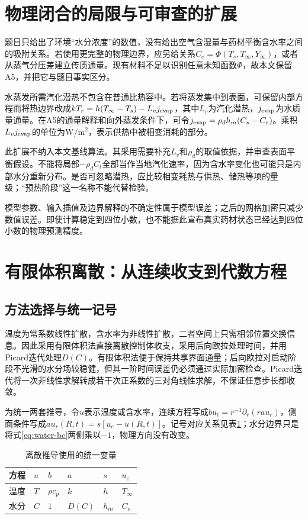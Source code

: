 \documentclass[UTF8,a4paper,zihao=-4,fontset=none]{ctexart}
\numberwithin{equation}{section}
\newcommand{\pd}{\partial}
\begin{document}
\section{物理闭合的局限与可审查的扩展}
题目只给出了环境“水分浓度”的数值，没有给出空气含湿量与药材平衡含水率之间的吸附关系。若使用更完整的物理边界，应另给关系$C_e=\Phi(T_s,T_\infty,Y_\infty)$，或者从蒸气分压差建立传质通量。现有材料不足以识别任意未知函数$\Phi$，故本文保留A5，并把它与题目事实区分。

水蒸发所需汽化潜热不包含在普通比热容中。若将蒸发集中到表面，可保留内部方程而将热边界改成$kT_r=h(T_\infty-T_s)-L_vj_{\rm evap}$，其中$L_v$为汽化潜热，$j_{\rm evap}$为水质量通量。在A5的通量解释和向外蒸发条件下，可令$j_{\rm evap}=\rho_dh_m(C_s-C_e)$。乘积$L_vj_{\rm evap}$的单位为$\mathrm{W/m^2}$，表示供热中被相变消耗的部分。

此扩展不纳入本文基线算法。其采用需要补充$L_v$和$\rho_d$的取值依据，并审查表面平衡假设。不能将局部$-\rho_dC_t$全部当作当地汽化速率，因为含水率变化也可能只是内部水分重新分布。是否可忽略潜热，应比较相变耗热与供热、储热等项的量级；“预热阶段”这一名称不能代替检验。

模型参数、输入插值及边界解释的不确定性属于模型误差；之后的网格加密只减少数值误差。即使计算稳定到四位小数，也不能据此宣布真实药材状态已经达到四位小数的物理预测精度。

\section{有限体积离散：从连续收支到代数方程}
\subsection{方法选择与统一记号}
温度为常系数线性扩散，含水率为非线性扩散，二者空间上只需相邻位置交换信息。因此采用有限体积法直接离散控制体收支，采用后向欧拉处理时间，并用Picard迭代处理$D(C)$。有限体积法便于保持共享界面通量；后向欧拉对启动阶段不光滑的水分场较稳健，但其一阶时间误差仍必须通过实际加密检查。Picard迭代将一次非线性求解转成若干次正系数的三对角线性求解，不保证任意步长都收敛。

为统一两套推导，令$u$表示温度或含水率，连续方程写成$b u_t=r^{-1}\pd_r(ra u_r)$，侧面条件写成$a u_r(R,t)=s[u_e-u(R,t)]$。记号对应关系见表\ref{tab:unified}；水分边界只是将式\eqref{eq:water-bc}两侧乘以$-1$，物理方向没有改变。

\begin{table}[htbp]
\centering
\caption{离散推导使用的统一变量}\label{tab:unified}
\begin{tabular}{@{}llllll@{}}
\toprule
方程 & $u$ & $b$ & $a$ & $s$ & $u_e$\\
\midrule
温度 & $T$ & $\rho c_p$ & $k$ & $h$ & $T_\infty$\\
水分 & $C$ & $1$ & $D(C)$ & $h_m$ & $C_e$\\
\bottomrule
\end{tabular}
\end{table}
\end{document}
